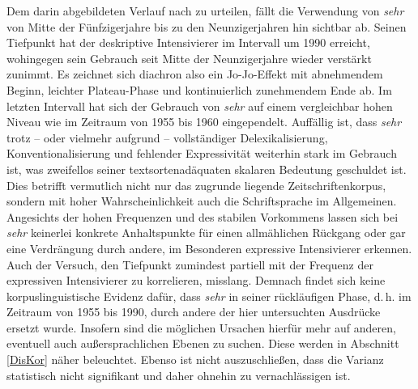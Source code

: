 Dem darin abgebildeten Verlauf nach zu urteilen, fällt die Verwendung von \textit{sehr} von Mitte der Fünfzigerjahre bis zu den Neunzigerjahren hin sichtbar ab. Seinen Tiefpunkt hat der deskriptive Intensivierer im Intervall um 1990 erreicht, wohingegen sein Gebrauch seit Mitte der Neunzigerjahre wieder verstärkt zunimmt. Es zeichnet sich diachron also ein Jo-Jo-Effekt mit abnehmendem Beginn, leichter Plateau-Phase und kontinuierlich zunehmendem Ende ab. Im letzten Intervall hat sich der Gebrauch von \textit{sehr} auf einem vergleichbar hohen Niveau wie im Zeitraum von 1955 bis 1960 eingependelt. Auffällig ist, dass \textit{sehr} trotz -- oder vielmehr aufgrund -- vollständiger Delexikalisierung, Konventionalisierung und fehlender Expressivität weiterhin stark im Gebrauch ist, was zweifellos seiner textsortenadäquaten skalaren Bedeutung geschuldet ist. Dies betrifft vermutlich nicht nur das zugrunde liegende Zeitschriftenkorpus, sondern mit hoher Wahrscheinlichkeit auch die Schriftsprache im Allgemeinen. Angesichts der hohen Frequenzen und des stabilen Vorkommens lassen sich bei \textit{sehr} keinerlei konkrete Anhaltspunkte für einen allmählichen Rückgang oder gar eine Verdrängung durch andere, im Besonderen expressive Intensivierer erkennen. Auch der Versuch, den Tiefpunkt zumindest partiell mit der Frequenz der expressiven Intensivierer zu korrelieren, misslang. Demnach findet sich keine korpuslinguistische Evidenz dafür, dass \textit{sehr} in seiner rückläufigen Phase, d.\,h. im Zeitraum von 1955 bis 1990, durch andere der hier untersuchten Ausdrücke ersetzt wurde. Insofern sind die möglichen Ursachen hierfür mehr auf anderen, eventuell auch außersprachlichen Ebenen zu suchen. Diese werden in Abschnitt \ref{DisKor} näher beleuchtet. Ebenso ist nicht auszuschließen, dass die Varianz statistisch nicht signifikant und daher ohnehin zu vernachlässigen ist.

